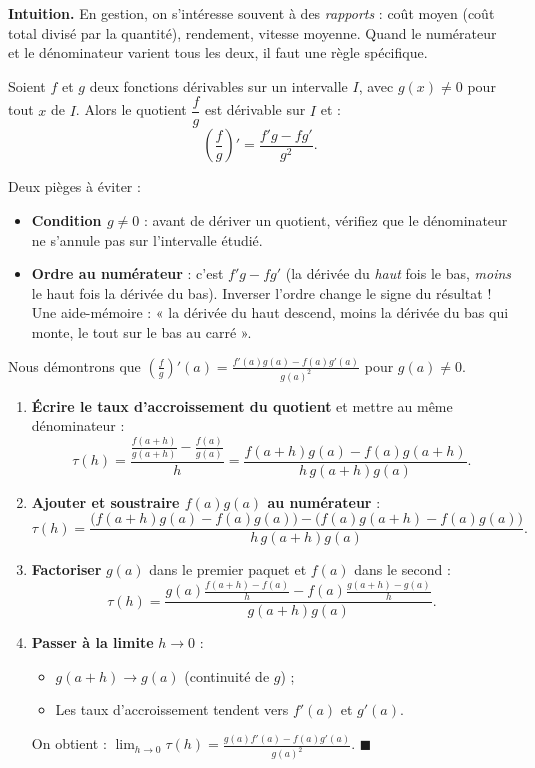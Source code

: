 \documentclass[11pt]{article}
\begin{document}
\textbf{Intuition.} En gestion, on s'intéresse souvent à des \emph{rapports} : coût moyen (coût total divisé par la quantité), rendement, vitesse moyenne. Quand le numérateur et le dénominateur varient tous les deux, il faut une règle spécifique.

\begin{propriete}
Soient $f$ et $g$ deux fonctions dérivables sur un intervalle $I$, avec $g(x) \neq 0$ pour tout $x$ de $I$. Alors le quotient $\dfrac{f}{g}$ est dérivable sur $I$ et :
\[ \left(\frac{f}{g}\right)' = \frac{f'g - fg'}{g^2}. \]
\end{propriete}

\begin{attention}
Deux pièges à éviter :
\begin{itemize}
\item \textbf{Condition $g \neq 0$} : avant de dériver un quotient, vérifiez que le dénominateur ne s'annule pas sur l'intervalle étudié.
\item \textbf{Ordre au numérateur} : c'est $f'g - fg'$ (la dérivée du \emph{haut} fois le bas, \emph{moins} le haut fois la dérivée du bas). Inverser l'ordre change le signe du résultat ! Une aide-mémoire : « la dérivée du haut descend, moins la dérivée du bas qui monte, le tout sur le bas au carré ».
\end{itemize}
\end{attention}

\begin{experience}
Nous démontrons que $\left(\frac{f}{g}\right)'(a) = \frac{f'(a)g(a) - f(a)g'(a)}{g(a)^2}$ pour $g(a) \neq 0$.

\begin{enumerate}
\item \textbf{Écrire le taux d'accroissement du quotient} et mettre au même dénominateur :
\[ \tau(h) = \frac{\frac{f(a+h)}{g(a+h)} - \frac{f(a)}{g(a)}}{h} = \frac{f(a+h)g(a) - f(a)g(a+h)}{h\,g(a+h)g(a)}. \]
\item \textbf{Ajouter et soustraire $f(a)g(a)$ au numérateur} :
\[ \tau(h) = \frac{\big(f(a+h)g(a) - f(a)g(a)\big) - \big(f(a)g(a+h) - f(a)g(a)\big)}{h\,g(a+h)g(a)}. \]
\item \textbf{Factoriser} $g(a)$ dans le premier paquet et $f(a)$ dans le second :
\[ \tau(h) = \frac{g(a)\frac{f(a+h)-f(a)}{h} - f(a)\frac{g(a+h)-g(a)}{h}}{g(a+h)g(a)}. \]
\item \textbf{Passer à la limite} $h \to 0$ :
\begin{itemize}
\item $g(a+h) \to g(a)$ (continuité de $g$) ;
\item Les taux d'accroissement tendent vers $f'(a)$ et $g'(a)$.
\end{itemize}
On obtient : $\displaystyle\lim_{h \to 0} \tau(h) = \frac{g(a)f'(a) - f(a)g'(a)}{g(a)^2}$. \hfill $\blacksquare$
\end{enumerate}
\end{experience}
\end{document}

